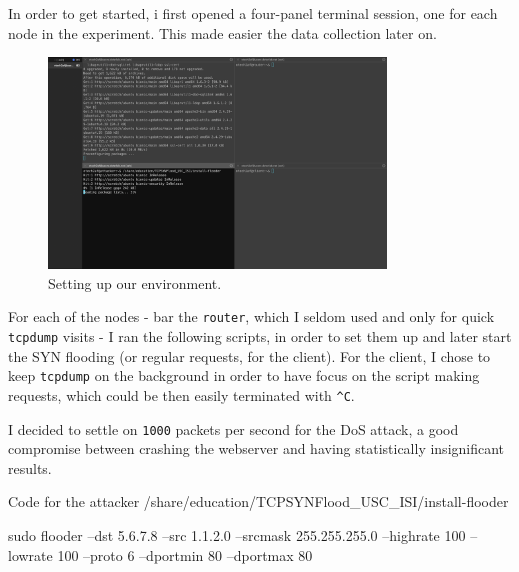 \documentclass[a4paper,11pt,hidelinks]{article}
\begin{document}
In order to get started, i first opened a four-panel terminal session, one for each node in the experiment. This made easier the data collection later on.

\begin{figure}[h!]
  \centering
  \includegraphics[width=0.8\textwidth]{../drawable/setup.png}
  \caption{Setting up our environment.}
\end{figure}

For each of the nodes - bar the \verb=router=, which I seldom used and only for quick \verb=tcpdump= visits - I ran the following scripts, in order to set them up and later start the SYN flooding (or regular requests, for the client). For the client, I chose to keep \verb=tcpdump= on the background in order to have focus on the script making requests, which could be then easily terminated with \verb=^C=.

I decided to settle on \verb=1000= packets per second for the DoS attack, a good compromise between crashing the webserver and having statistically insignificant results.


\begin{code}{Code for the attacker}
  /share/education/TCPSYNFlood_USC_ISI/install-flooder

  sudo flooder --dst 5.6.7.8 --src 1.1.2.0
  --srcmask 255.255.255.0 --highrate 100
  --lowrate 100 --proto 6 --dportmin 80
  --dportmax 80
\end{code}
\end{document}
